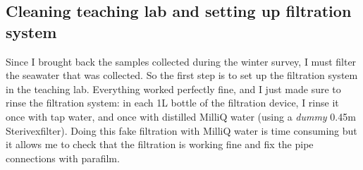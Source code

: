 \subsection{Cleaning teaching lab and setting up filtration system}
\label{task:20180305_cj1}

Since I brought back the samples collected during the winter survey, I must filter the seawater that was collected. So the first step is to set up the filtration system in the teaching lab. Everything worked perfectly fine, and I just made sure to rinse the filtration system: in each 1L bottle of the filtration device, I rinse it once with tap water, and once with distilled MilliQ water (using a \textit{dummy} 0.45\textmu m Sterivex\texttrademark filter). Doing this fake filtration with MilliQ water is time consuming but it allows me to check that the filtration is working fine and fix the pipe connections with parafilm. 


